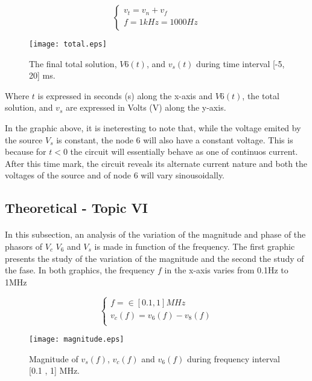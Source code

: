 \[
\left\{\begin{matrix}
v_t=v_n+v_f\\
f = 1 kHz = 1000 Hz \\
\end{matrix}\right.
\]

\begin{figure}[H] \centering
\texttt{[image: total.eps]}
\caption{The final total solution, $V6(t)$,  and $v_s(t)$ during time interval [-5, 20] ms.}
\label{fig:theo_fifth}
\end{figure}


Where $t$ is expressed in seconds (s) along the x-axis and 
$V6(t)$, the total solution, and $v_s$ are expressed in Volts (V) along the y-axis.

In the graphic above, it is ineteresting to note that, while the voltage emited by the source $V_s$ is constant, the node 6 will also have a constant voltage. This is because for $t<0$ the circuit will essentially behave as one of continuos current. After this time mark, the circuit reveals its alternate current nature and both the voltages of the source and of node 6 will vary sinousoidally.



  

\subsection{Theoretical - Topic VI}
\label{subsec:sixth_topic}

\paragraph{}In this subsection, an analysis of the variation of the magnitude and phase of the phasors of $V_c$ $V_6$ and $V_s$ is made in function of the frequency. The first graphic presents the study of the variation of the magnitude and the second the study of the fase. In both graphics, the frequency $f$ in the x-axis varies from 0.1Hz to 1MHz


\[
\left\{\begin{matrix}
f =\in [0.1 , 1] MHz \\
v_c(f)=v_6(f)-v_8(f) \\
\end{matrix}\right.
\]


\begin{figure}[H] \centering
\texttt{[image: magnitude.eps]}
\caption{Magnitude of $v_s(f)$,  $v_c(f)$  and $v_6(f)$ during frequency interval [0.1 , 1] MHz.}
\label{fig:magnitudetheo}
\end{figure}

